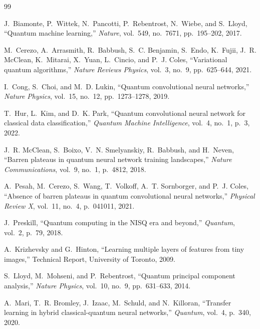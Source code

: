 \documentclass[10pt,twocolumn,twoside,a4paper]{article}
\begin{document}
\begin{thebibliography}{99}

J.~Biamonte, P.~Wittek, N.~Pancotti, P.~Rebentrost, N.~Wiebe, and S.~Lloyd,
``Quantum machine learning,''
\textit{Nature}, vol.~549, no.~7671, pp.~195--202, 2017.

M.~Cerezo, A.~Arrasmith, R.~Babbush, S.~C. Benjamin, S.~Endo, K.~Fujii, J.~R. McClean, K.~Mitarai, X.~Yuan, L.~Cincio, and P.~J. Coles,
``Variational quantum algorithms,''
\textit{Nature Reviews Physics}, vol.~3, no.~9, pp.~625--644, 2021.

I.~Cong, S.~Choi, and M.~D. Lukin,
``Quantum convolutional neural networks,''
\textit{Nature Physics}, vol.~15, no.~12, pp.~1273--1278, 2019.

T.~Hur, L.~Kim, and D.~K. Park,
``Quantum convolutional neural network for classical data classification,''
\textit{Quantum Machine Intelligence}, vol.~4, no.~1, p.~3, 2022.

J.~R. McClean, S.~Boixo, V.~N. Smelyanskiy, R.~Babbush, and H.~Neven,
``Barren plateaus in quantum neural network training landscapes,''
\textit{Nature Communications}, vol.~9, no.~1, p.~4812, 2018.

A.~Pesah, M.~Cerezo, S.~Wang, T.~Volkoff, A.~T. Sornborger, and P.~J. Coles,
``Absence of barren plateaus in quantum convolutional neural networks,''
\textit{Physical Review X}, vol.~11, no.~4, p.~041011, 2021.

J.~Preskill,
``Quantum computing in the NISQ era and beyond,''
\textit{Quantum}, vol.~2, p.~79, 2018.

A.~Krizhevsky and G.~Hinton,
``Learning multiple layers of features from tiny images,''
Technical Report, University of Toronto, 2009.

S.~Lloyd, M.~Mohseni, and P.~Rebentrost,
``Quantum principal component analysis,''
\textit{Nature Physics}, vol.~10, no.~9, pp.~631--633, 2014.

A.~Mari, T.~R. Bromley, J.~Izaac, M.~Schuld, and N.~Killoran,
``Transfer learning in hybrid classical-quantum neural networks,''
\textit{Quantum}, vol.~4, p.~340, 2020.


\end{thebibliography}
\end{document}
